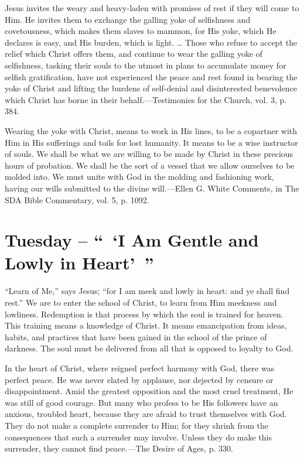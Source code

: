 \documentclass[a4paper, 10pt, twoside, headings=small]{scrartcl}
\begin{document}
\begin{multicols}{2}
Jesus invites the weary and heavy-laden with promises of rest if they will come to Him. He invites them to exchange the galling yoke of selfishness and covetousness, which makes them slaves to mammon, for His yoke, which He declares is easy, and His burden, which is light. … Those who refuse to accept the relief which Christ offers them, and continue to wear the galling yoke of selfishness, tasking their souls to the utmost in plans to accumulate money for selfish gratification, have not experienced the peace and rest found in bearing the yoke of Christ and lifting the burdens of self-denial and disinterested benevolence which Christ has borne in their behalf.—Testimonies for the Church, vol. 3, p. 384.

Wearing the yoke with Christ, means to work in His lines, to be a copartner with Him in His sufferings and toils for lost humanity. It means to be a wise instructor of souls. We shall be what we are willing to be made by Christ in these precious hours of probation. We shall be the sort of a vessel that we allow ourselves to be molded into. We must unite with God in the molding and fashioning work, having our wills submitted to the divine will.—Ellen G. White Comments, in The SDA Bible Commentary, vol. 5, p. 1092.

\section*{Tuesday – “ ‘I Am Gentle and Lowly in Heart’ ”}

“Learn of Me,” says Jesus; “for I am meek and lowly in heart: and ye shall find rest.” We are to enter the school of Christ, to learn from Him meekness and lowliness. Redemption is that process by which the soul is trained for heaven. This training means a knowledge of Christ. It means emancipation from ideas, habits, and practices that have been gained in the school of the prince of darkness. The soul must be delivered from all that is opposed to loyalty to God.

In the heart of Christ, where reigned perfect harmony with God, there was perfect peace. He was never elated by applause, nor dejected by censure or disappointment. Amid the greatest opposition and the most cruel treatment, He was still of good courage. But many who profess to be His followers have an anxious, troubled heart, because they are afraid to trust themselves with God. They do not make a complete surrender to Him; for they shrink from the consequences that such a surrender may involve. Unless they do make this surrender, they cannot find peace.—The Desire of Ages, p. 330.


\end{multicols}
\end{document}
